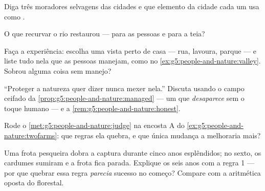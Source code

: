 \begin{exercise}[$\star$]\label{exo:g5:people-and-nature:6}
Diga três moradores selvagens das cidades e que elemento da cidade
cada um usa como .
\end{exercise}

\begin{exercise}[$\star$]\label{exo:g5:people-and-nature:7}
O que recurvar o rio restaurou --- para as pessoas e para a teia?
\end{exercise}

\begin{exercise}[$\star$]\label{exo:g5:people-and-nature:8}
Faça a experiência: escolha uma vista perto de casa --- rua, lavoura,
parque --- e liste tudo nela que as pessoas manejam, como no
\cref{ex:g5:people-and-nature:valley}. Sobrou alguma coisa sem
manejo?
\end{exercise}

\begin{exercise}[$\star\star$]\label{exo:g5:people-and-nature:9}
``Proteger a natureza quer dizer nunca mexer nela.'' Discuta usando o
campo ceifado da \cref{prop:g5:people-and-nature:managed} --- um
 que \emph{desaparece} sem o toque humano --- e a
\cref{rem:g5:people-and-nature:honest}.
\end{exercise}

\begin{exercise}[$\star\star$]\label{exo:g5:people-and-nature:10}
Rode o \cref{met:g5:people-and-nature:judge} na encosta A do
\cref{ex:g5:people-and-nature:twofarms}: que regras ela quebra, e que
única mudança a melhoraria mais?
\end{exercise}

\begin{exercise}[$\star\star\star$]\label{exo:g5:people-and-nature:11}
Uma frota pesqueira dobra a captura durante cinco anos esplêndidos;
no sexto, os cardumes sumiram e a frota fica parada. Explique os seis
anos com a regra 1 --- por que quebrar essa regra \emph{parecia}
sucesso no começo? Compare com a aritmética oposta do florestal.
\end{exercise}

